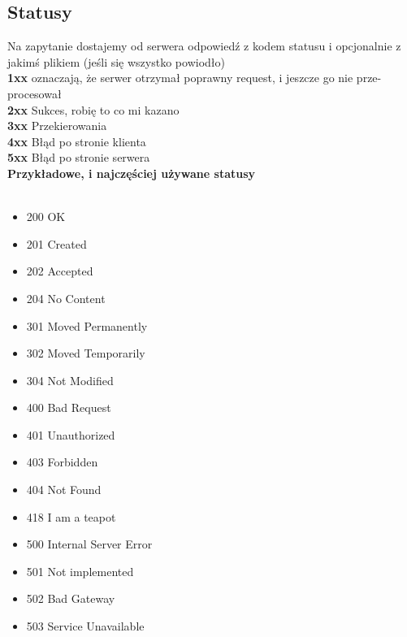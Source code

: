 \documentclass[]{article}
\begin{document}
\subsection{Statusy}
Na zapytanie dostajemy od serwera odpowiedź z kodem statusu i opcjonalnie z jakimś plikiem (jeśli się wszystko powiodło)\\
\textbf{1xx} oznaczają, że serwer otrzymał poprawny request, i jeszcze go nie prze-procesował\\
\textbf{2xx} Sukces, robię to co mi kazano\\
\textbf{3xx} Przekierowania\\
\textbf{4xx} Błąd po stronie klienta\\
\textbf{5xx} Błąd po stronie serwera\\
\textbf{Przykładowe, i najczęściej używane statusy}\\\\
\begin{multicols}{2}
\begin{itemize}
    \item 200 OK
    \item 201 Created
    \item 202 Accepted
    \item 204 No Content
    \item 301 Moved Permanently
    \item 302 Moved Temporarily
    \item 304 Not Modified
    \item 400 Bad Request
    \item 401 Unauthorized
    \item 403 Forbidden
    \item 404 Not Found
    \item 418 I am a teapot
    \item 500 Internal Server Error
    \item 501 Not implemented
    \item 502 Bad Gateway
    \item 503 Service Unavailable
\end{itemize}
\end{multicols}
\end{document}
